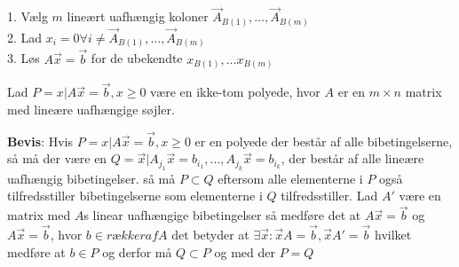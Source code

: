 %
\begin{alg}
1. Vælg $m$ lineært uafhængig koloner $\vec{A}_{B(1)},\dots,\vec{A}_{B(m)}$\\
2. Lad $x_i=0\forall i\neq\vec{A}_{B(1)},\dots,\vec{A}_{B(m)}$\\
3. Løs $A\vec{x}=\vec{b}$ for de ubekendte $x_{B(1)},\dots x_{B(m)}$
\end{alg}

\begin{stn}
Lad $P=x|A\vec{x}=\vec{b},x\geq 0$ være en ikke-tom polyede, hvor $A$ er en $m\times n$ matrix med lineære uafhængige søjler.\\
\end{stn}
\textbf{Bevis}:
Hvis $P=x|A\vec{x}=\vec{b},x\geq 0$ er en polyede der består af alle bibetingelserne, så må der være en $Q=\vec{x}|A_{j_1}\vec{x}=b_{i_1},\dots ,A_{j_k}\vec{x}=b_{i_k}$, der består af alle lineære uafhængig bibetingelser. så må $P\subset Q$ eftersom alle elementerne i $P$ også tilfredsstiller bibetingelserne som elementerne i $Q$ tilfredsstiller.
Lad $A'$ være en matrix med $A$s linear uafhængige bibetingelser så medføre det at $A\vec{x}=\vec{b}$ og $A\vec{x}=\vec{b}$, hvor $b\in {rækker af A}$ det betyder at $\exists \vec{x}:\vec{x}A=\vec{b}, \vec{x}A'=\vec{b}$ hvilket medføre at $b\in P$ og derfor må $Q\subset P$ og med der $P=Q$
